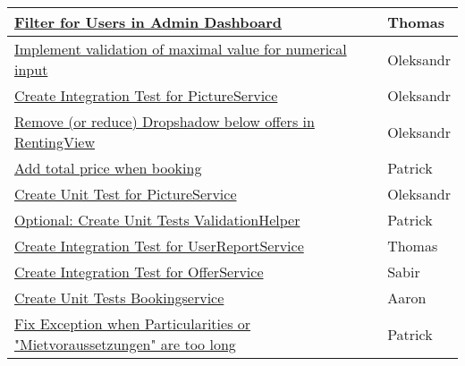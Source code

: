 \begin{table}[h]
\begin{tabular}{|p{}|p{1cm}|p{}|}
    \hline
	\href{https://gitlab.rz.uni-bamberg.de/swt/teaching/2021-ws/swt-swl-b/group-a/-/issues/153}{Filter for Users in Admin Dashboard} &   & Thomas \\

    \hline
	\href{https://gitlab.rz.uni-bamberg.de/swt/teaching/2021-ws/swt-swl-b/group-a/-/issues/145}{Implement validation of maximal value for numerical input} &   & Oleksandr \\

    \hline
	\href{https://gitlab.rz.uni-bamberg.de/swt/teaching/2021-ws/swt-swl-b/group-a/-/issues/145}{Create Integration Test for PictureService} &   & Oleksandr \\
    
    \hline
	\href{https://gitlab.rz.uni-bamberg.de/swt/teaching/2021-ws/swt-swl-b/group-a/-/issues/154}{Remove (or reduce) Dropshadow below offers in RentingView} &   & Oleksandr \\

    \hline
	\href{https://gitlab.rz.uni-bamberg.de/swt/teaching/2021-ws/swt-swl-b/group-a/-/issues/149}{Add total price when booking} &   & Patrick \\

    \hline
	\href{https://gitlab.rz.uni-bamberg.de/swt/teaching/2021-ws/swt-swl-b/group-a/-/issues/159}{Create Unit Test for PictureService} &   & Oleksandr \\

    \hline
	\href{https://gitlab.rz.uni-bamberg.de/swt/teaching/2021-ws/swt-swl-b/group-a/-/issues/126}{Optional: Create Unit Tests ValidationHelper} &   & Patrick \\

    \hline
	\href{https://gitlab.rz.uni-bamberg.de/swt/teaching/2021-ws/swt-swl-b/group-a/-/issues/165}{Create Integration Test for UserReportService} &   & Thomas \\

    \hline
	\href{https://gitlab.rz.uni-bamberg.de/swt/teaching/2021-ws/swt-swl-b/group-a/-/issues/163}{Create Integration Test for OfferService} &   & Sabir \\

    \hline
	\href{https://gitlab.rz.uni-bamberg.de/swt/teaching/2021-ws/swt-swl-b/group-a/-/issues/83}{Create Unit Tests Bookingservice} &   & Aaron \\

    \hline
	\href{https://gitlab.rz.uni-bamberg.de/swt/teaching/2021-ws/swt-swl-b/group-a/-/issues/169}{Fix Exception when Particularities or "Mietvoraussetzungen" are too long} &   & Patrick \\


\end{tabular}
\end{table}
